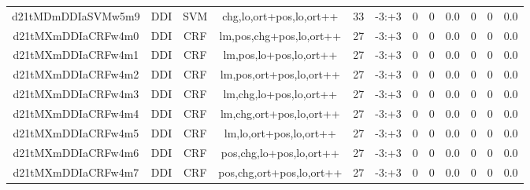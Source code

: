 \documentclass[a4paper]{article}
\begin{document}
\begin{landscape}
\begin{center}
\begin{tabular}{ |c|c|c|c|c|c|c|c|c|c|c|c|}
 	

 
 	
 	\small{ d21tMDmDDIaSVMw5m9 } & \small{ DDI} & \small{  SVM }  & chg,lo,ort+pos,lo,ort++  &  33 &  \small{  -3:+3 }  &  0 & 0 & 0.0  &  0 & 0 & 0.0 \\
 	

 
 	
 	\small{ d21tMXmDDIaCRFw4m0 } & \small{ DDI} & \small{  CRF }  & lm,pos,chg+pos,lo,ort++  &  27 &  \small{  -3:+3 }  &  0 & 0 & 0.0  &  0 & 0 & 0.0 \\
 	

 
 	
 	\small{ d21tMXmDDIaCRFw4m1 } & \small{ DDI} & \small{  CRF }  & lm,pos,lo+pos,lo,ort++  &  27 &  \small{  -3:+3 }  &  0 & 0 & 0.0  &  0 & 0 & 0.0 \\
 	

 
 	
 	\small{ d21tMXmDDIaCRFw4m2 } & \small{ DDI} & \small{  CRF }  & lm,pos,ort+pos,lo,ort++  &  27 &  \small{  -3:+3 }  &  0 & 0 & 0.0  &  0 & 0 & 0.0 \\
 	

 
 	
 	\small{ d21tMXmDDIaCRFw4m3 } & \small{ DDI} & \small{  CRF }  & lm,chg,lo+pos,lo,ort++  &  27 &  \small{  -3:+3 }  &  0 & 0 & 0.0  &  0 & 0 & 0.0 \\
 	

 
 	
 	\small{ d21tMXmDDIaCRFw4m4 } & \small{ DDI} & \small{  CRF }  & lm,chg,ort+pos,lo,ort++  &  27 &  \small{  -3:+3 }  &  0 & 0 & 0.0  &  0 & 0 & 0.0 \\
 	

 
 	
 	\small{ d21tMXmDDIaCRFw4m5 } & \small{ DDI} & \small{  CRF }  & lm,lo,ort+pos,lo,ort++  &  27 &  \small{  -3:+3 }  &  0 & 0 & 0.0  &  0 & 0 & 0.0 \\
 	

 
 	
 	\small{ d21tMXmDDIaCRFw4m6 } & \small{ DDI} & \small{  CRF }  & pos,chg,lo+pos,lo,ort++  &  27 &  \small{  -3:+3 }  &  0 & 0 & 0.0  &  0 & 0 & 0.0 \\
 	

 
 	
 	\small{ d21tMXmDDIaCRFw4m7 } & \small{ DDI} & \small{  CRF }  & pos,chg,ort+pos,lo,ort++  &  27 &  \small{  -3:+3 }  &  0 & 0 & 0.0  &  0 & 0 & 0.0 \\
 	


\end{tabular}
\end{center}
\end{landscape}
\end{document}
